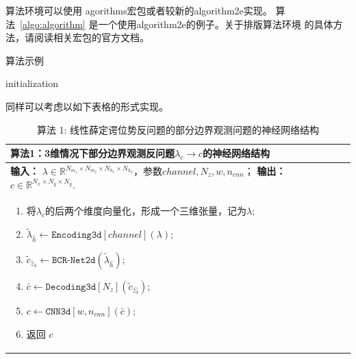 算法环境可以使用 agorithms宏包或者较新的algorithm2e实现。
算法~\ref{algo:algorithm} 是一个使用algorithm2e的例子。关于排版算法环境
的具体方法，请阅读相关宏包的官方文档。

\begin{algorithm}[htb]
  \caption{算法示例}
  \label{algo:algorithm}
  \small
  \SetAlgoLined

  initialization\;
\end{algorithm}

同样可以考虑以如下表格的形式实现。
\begin{table}[H] 
\centering
\begin{tabular}{p{\textwidth}}
\toprule
\textbf{算法1：3维情况下部分边界观测反问题$\lambda_c\rightarrow c$的神经网络结构}  \\%
\midrule
\textbf{输入：} %
$\lambda\in\mathbb{R}^{N_{m_1}\times N_{m_2}\times N_{h_1}\times N_{h_2}}$，参数$channel,N_{z},w,n_{cnn}$；
\textbf{输出：} %
$c\in \mathbb{R}^{N_x\times N_y\times N_y}$. \\[-15pt]%
\begin{enumerate}[1:]
  \item 将$\lambda_c$的后两个维度向量化，形成一个三维张量，记为$\lambda$;
  \item $\tilde{\lambda}_{\hat{h}}\leftarrow\texttt{Encoding3d}[channel](\lambda)$; %
  \item  $\tilde{c}_{\hat{z}_3}\leftarrow\texttt{BCR-Net2d}(\tilde{\lambda}_{\hat{h}}) $; %
  \item $\bar{c}\leftarrow\texttt{Decoding3d}[N_z](\tilde{c}_{\hat{z_3}})$;%
  \item $c\leftarrow\texttt{CNN3d}[w,n_{cnn}](\bar{c})$;%
  \item 返回 $c$ %
\end{enumerate} \\%
\bottomrule
\end{tabular}
\caption*{算法 1: 线性薛定谔位势反问题的部分边界观测问题的神经网络结构}
\end{table}



